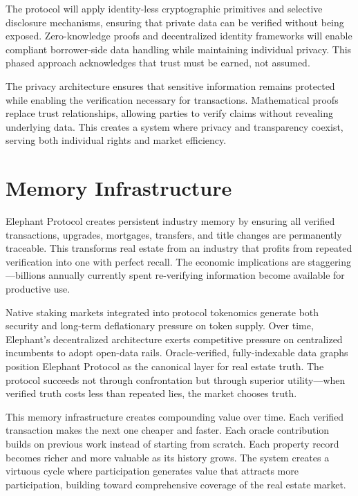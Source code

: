The protocol will apply identity-less cryptographic primitives and selective disclosure mechanisms, ensuring that private data can be verified without being exposed. Zero-knowledge proofs and decentralized identity frameworks will enable compliant borrower-side data handling while maintaining individual privacy. This phased approach acknowledges that trust must be earned, not assumed.

The privacy architecture ensures that sensitive information remains protected while enabling the verification necessary for transactions. Mathematical proofs replace trust relationships, allowing parties to verify claims without revealing underlying data. This creates a system where privacy and transparency coexist, serving both individual rights and market efficiency.

\section{Memory Infrastructure}

Elephant Protocol creates persistent industry memory by ensuring all verified transactions, upgrades, mortgages, transfers, and title changes are permanently traceable. This transforms real estate from an industry that profits from repeated verification into one with perfect recall. The economic implications are staggering---billions annually currently spent re-verifying information become available for productive use.

Native staking markets integrated into protocol tokenomics generate both security and long-term deflationary pressure on token supply. Over time, Elephant's decentralized architecture exerts competitive pressure on centralized incumbents to adopt open-data rails. Oracle-verified, fully-indexable data graphs position Elephant Protocol as the canonical layer for real estate truth. The protocol succeeds not through confrontation but through superior utility---when verified truth costs less than repeated lies, the market chooses truth.

This memory infrastructure creates compounding value over time. Each verified transaction makes the next one cheaper and faster. Each oracle contribution builds on previous work instead of starting from scratch. Each property record becomes richer and more valuable as its history grows. The system creates a virtuous cycle where participation generates value that attracts more participation, building toward comprehensive coverage of the real estate market.